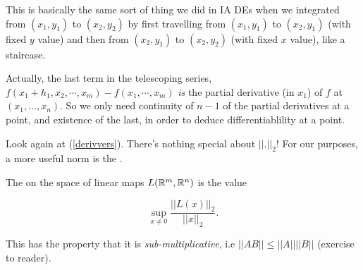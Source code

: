 \documentclass[11pt]{scrartcl}
\begin{document}
\begin{remark} 
This is basically the same sort of thing we did in IA DEs when we integrated from $(x_1, y_1)$ to $(x_2, y_2)$ by first travelling from $(x_1, y_1)$ to $(x_2, y_1)$ (with fixed $y$ value) and then from $(x_2, y_1)$ to $(x_2, y_2)$ (with fixed $x$ value), like a staircase.
\end{remark}

\begin{remark}
    Actually, the last term in the telescoping series, $f(x_1 + h_1, x_2, \cdots , x_m) - f(x_1, \cdots , x_m)$ \emph{is} the partial derivative (in $x_1$) of $f$ at $(x_1, ... , x_n)$. So we only need continuity of $n-1$ of the partial derivatives at a point, and existence of the last, in order to deduce differentiablility at a point.
\end{remark}

Look again at (\ref{derivvers}). There's nothing special about $||.||_2$! For our purposes, a more useful norm is the .

\begin{definition}

The  on the space of linear maps $L(\mathbb R^m, \mathbb R^n)$ is the value

\begin{equation}
    \sup_{x \neq 0} \frac{||L(x)||_2}{||x||_2}.
\end{equation}
\end{definition}

This has the property that it is \emph{sub-multiplicative}, i.e $||AB|| \le ||A||||B||$ (exercise to reader).
\end{document}
